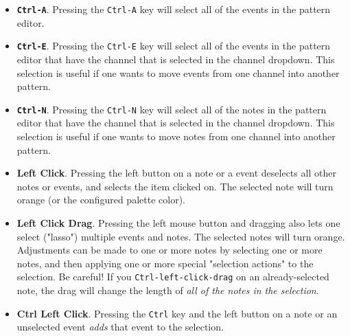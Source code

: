    \begin{itemize}
      \item
         \textbf{\texttt{Ctrl-A}}.
         Pressing the \texttt{Ctrl-A} key will select all of the events in the
         pattern editor.
      \item
         \textbf{\texttt{Ctrl-E}}.
         Pressing the \texttt{Ctrl-E} key will select all of the events in the
         pattern editor that have the channel that is selected in the
         channel dropdown.
         This selection is useful if one wants to move events from one channel
         into another pattern.
      \item
         \textbf{\texttt{Ctrl-N}}.
         Pressing the \texttt{Ctrl-N} key will select all of the notes
         in the pattern editor that have the channel that is selected in the
         channel dropdown.
         This selection is useful if one wants to move notes from one channel
         into another pattern.
      \item
         \textbf{Left Click}.
         Pressing the left button on a note or a event deselects all other
         notes or events, and selects the item clicked on.
         The selected note will turn orange (or the configured palette color).
      \item
         \textbf{Left Click Drag}.
         Pressing the left mouse button and dragging also lets one
         select ("lasso") multiple events and notes.
         The selected notes will turn orange.
         Adjustments can be made to one or more notes by selecting one or more
         notes, and then applying one or more special
         "selection actions" to the selection.
         Be careful!  If you \texttt{Ctrl-left-click-drag}
         on an already-selected note,
         the drag will change the length of
         \textsl{all of the notes in the selection}.
      \item {}
         \textbf{Ctrl Left Click}.
         Pressing the \texttt{Ctrl} key and the left button on a note or an
         unselected event \textsl{adds} that event to the selection.

\end{itemize}
